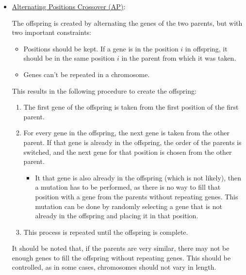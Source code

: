 \begin{itemize}
    \item \ul{Alternating Positions Crossover (AP)}:
    
    The offspring is created by alternating the genes of the two parents, but with two important constraints:
    \begin{itemize}
        \item Positions should be kept. If a gene is in the position $i$ in offspring, it should be in the same position $i$ in the parent from which it was taken.
        \item Genes can't be repeated in a chromosome.
    \end{itemize}
    
    This results in the following procedure to create the offspring:
    \begin{enumerate}
        \item The first gene of the offspring is taken from the first position of the first parent.
        \item For every gene in the offspring, the next gene is taken from the other parent. If that gene is already in the offspring, the order of the parents is switched, and the next gene for that position is chosen from the other parent.
        \begin{itemize}
            \item It that gene is also already in the offspring (which is not likely), then a mutation has to be performed, as there is no way to fill that position with a gene from the parents without repeating genes. This mutation can be done by randomly selecting a gene that is not already in the offspring and placing it in that position.
        \end{itemize}

        \item This process is repeated until the offspring is complete.
    \end{enumerate}

    It should be noted that, if the parents are very similar, there may not be enough genes to fill the offspring without repeating genes. This should be controlled, as in some cases, chromosomes should not vary in length.
\end{itemize}


